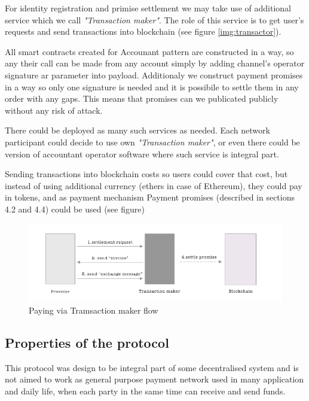 \documentclass[a4paper,12pt]{article}
\begin{document}
For identity registration and primise settlement we may take use of additional
service which we call \textit{"Transaction maker"}. The role of this service is 
to get user's requests and send transactions into blockchain (see figure 
\ref{img:transactor}).

All smart contracts created for Accounant pattern are constructed in a way, so
any their call can be made from any account simply by adding channel's operator
signature ar parameter into payload. Additionaly we construct payment promises 
in a way so only one signature is needed and it is possibile to settle them in 
any order with any gaps. This means that promises can we publicated publicly
without any risk of attack.

There could be deployed as many such services as needed.
Each network participant could decide to use own \textit{"Transaction maker"},
or even there could be version of accountant operator software where such 
service is integral part.

Sending transactions into blockchain costs so users could cover that cost, but
instead of using additional currency (ethers in case of Ethereum), they could
pay in tokens, and as payment mechanism Payment promises (described in sections
4.2 and 4.4) could be used (see figure)

\begin{figure}[H]
    \centering
    \includegraphics[scale=0.5]{img/transactor-payment}
    \caption{Paying via Tramsaction maker flow}
    \label{img:transactor-payment}
\end{figure}

\subsection{Properties of the protocol}

This protocol was design to be integral part of some decentralised system and 
is not aimed to work as general purpose payment network used in many 
application and daily life, when each party in the same time can receive and 
send funds. 
\end{document}
